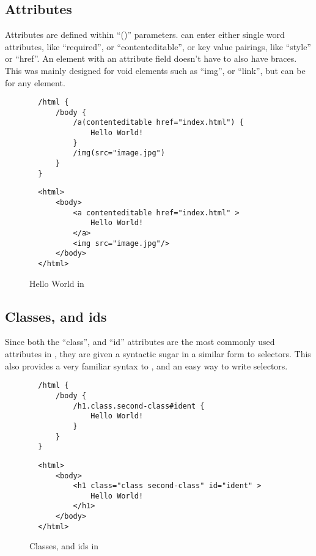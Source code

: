 \subsection{Attributes}
Attributes are defined within ``()'' parameters. \You{} can enter either single word attributes, like ``required'', or ``contenteditable'', or key value pairings, like ``style'' or ``href''. An element with an attribute field doesn't have to also have braces. This was mainly designed for void elements such as ``img'', or ``link'', but can be for any element.

\begin{figure}[!htbp]
    \Large{\textbf{\languageName{}}}\normalsize{}
  \begin{verbatim}
  /html {
      /body {
          /a(contenteditable href="index.html") {
              Hello World!
          }
          /img(src="image.jpg")
      }
  }
  \end{verbatim}
    \Large{\textbf{}}\normalsize{}

  \begin{verbatim}
  <html>
      <body>
          <a contenteditable href="index.html" >
              Hello World!
          </a>
          <img src="image.jpg"/>
      </body>
  </html>
  \end{verbatim}
  \caption{Hello World in \languageName{}}
\end{figure}
\newpage
\subsection{Classes, and ids}
Since both the ``class'', and ``id'' attributes are the most commonly used attributes in , they are given a syntactic sugar in a similar form to  selectors. This also provides a very familiar syntax to \you{}, and an easy way to write  selectors.

\begin{figure}[!htbp]
  \Large{\textbf{\languageName{}}}\normalsize{}
  \begin{verbatim}
  /html {
      /body {
          /h1.class.second-class#ident {
              Hello World!
          }
      }
  }
  \end{verbatim}
  \Large{\textbf{}}\normalsize{}

  \begin{verbatim}
  <html>
      <body>
          <h1 class="class second-class" id="ident" >
              Hello World!
          </h1>
      </body>
  </html>
  \end{verbatim}
  \caption{Classes, and ids in \languageName{}}
\end{figure}

